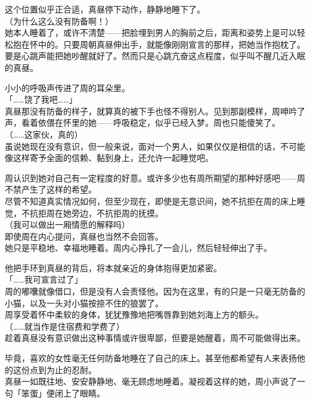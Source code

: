 这个位置似乎正合适，真昼停下动作，静静地睡下了。\\

（为什么这么没有防备啊！）\\

她本人睡着了，或许不清楚——把脸埋到男人的胸前之后，距离和姿势上是可以轻松抱在怀中的。只要周朝真昼伸出手，就能像刚刚宣言的那样，把她当作抱枕了。\\

要是心跳声能把她吵醒就好了。然而只是心跳亢奋这点程度，似乎叫不醒几近入眠的真昼。

小小的呼吸声传进了周的耳朵里。\\

「……饶了我吧……」\\

真昼那没有防备的样子，就算真的被下手也怪不得别人。见到那副模样，周呻吟了声，看着依偎在怀里的她——呼吸稳定，似乎已经入梦。周也只能傻笑了。\\

（……这家伙，真的）\\

虽说她现在没有意识，但一般来说，面对一个男人，如果仅仅是相信的话，不可能像这样寄予全面的信赖、黏到身上，还允许一起睡觉吧。

周认识到她对自己有一定程度的好意。或许多少也有周所期望的那种好感吧——周不禁产生了这样的希望。\\

尽管不知道真实情况如何，但至少现在，即使是无意识间，她不抗拒在周的床上睡觉，不抗拒周在她旁边，不抗拒周的抚摸。\\

（我可以做出一厢情愿的解释吗）\\

即使周在内心提问，真昼也当然不会回答。\\

她只是平稳地、幸福地睡着。周内心挣扎了一会儿，然后轻轻伸出了手。

他把手环到真昼的背后，将本就亲近的身体抱得更加紧密。\\

「……我可宣言过了」\\

周的嘟囔就像借口，但是没有人会责怪他。因为在这里，有的只是一只毫无防备的小猫，以及一头对小猫按捺不住的狼罢了。\\

周享受着怀中柔软的身体，犹犹豫豫地把嘴唇靠到她刘海上方的额头。\\

（……就当作是住宿费和学费了）\\

趁着真昼没有意识做出这种事情或许很卑鄙，但要是她醒着，周不可能做得出来。

毕竟，喜欢的女性毫无任何防备地睡在了自己的床上。甚至他都希望有人来表扬他的这份点到为止的忍耐。\\

真昼一如既往地、安安静静地、毫无顾虑地睡着。凝视着这样的她，周小声说了一句「笨蛋」便闭上了眼睛。
